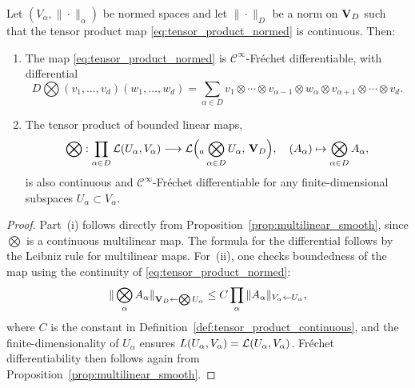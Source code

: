 \begin{proposition}
\label{prop:tensor_smooth}
Let $(V_\alpha, \|\cdot\|_\alpha)$ be normed spaces and let $\|\cdot\|_D$
be a norm on $\mathbf{V}_D$ such that the tensor product map
\eqref{eq:tensor_product_normed} is continuous. Then:
\begin{enumerate}
\item[\textup{(i)}] The map \eqref{eq:tensor_product_normed} is
    $\mathcal{C}^\infty$-Fréchet differentiable, with differential
    \begin{equation}
    \label{eq:diff_tensor_product}
        D\bigotimes(v_1,\ldots,v_d)(w_1,\ldots,w_d)
        = \sum_{\alpha \in D}
          v_1 \otimes \cdots \otimes v_{\alpha-1} \otimes
          w_\alpha \otimes v_{\alpha+1} \otimes \cdots \otimes v_d.
    \end{equation}
\item[\textup{(ii)}] The tensor product of bounded linear maps,
    \begin{equation*}
        \bigotimes :
        \prod_{\alpha \in D} \mathcal{L}(U_\alpha, V_\alpha)
        \longrightarrow
        \mathcal{L}\Bigl({}_a\bigotimes_{\alpha \in D} U_\alpha,\, \mathbf{V}_D\Bigr),
        \quad
        (A_\alpha) \mapsto \bigotimes_{\alpha \in D} A_\alpha,
    \end{equation*}
    is also continuous and $\mathcal{C}^\infty$-Fréchet differentiable
    for any finite-dimensional subspaces $U_\alpha \subset V_\alpha$.
\end{enumerate}
\end{proposition}

\begin{proof}
Part~(i) follows directly from Proposition~\ref{prop:multilinear_smooth},
since $\bigotimes$ is a continuous multilinear map. The formula for the
differential follows by the Leibniz rule for multilinear maps. For~(ii),
one checks boundedness of the map using the continuity of
\eqref{eq:tensor_product_normed}:
\begin{equation*}
    \|\bigotimes_\alpha A_\alpha\|_{\mathbf{V}_D \leftarrow \bigotimes U_\alpha}
    \leq C \prod_\alpha \|A_\alpha\|_{V_\alpha \leftarrow U_\alpha},
\end{equation*}
where $C$ is the constant in Definition~\ref{def:tensor_product_continuous},
and the finite-dimensionality of $U_\alpha$ ensures
$L(U_\alpha, V_\alpha) = \mathcal{L}(U_\alpha, V_\alpha)$.
Fréchet differentiability then follows again from
Proposition~\ref{prop:multilinear_smooth}.
\end{proof}

